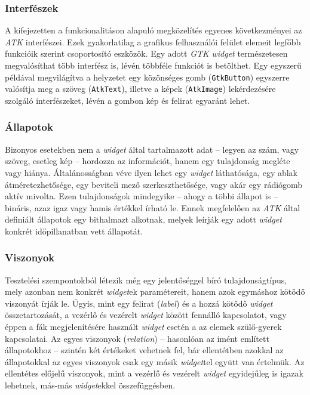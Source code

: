 \subsubsection{Interfészek}

A kifejezetten a funkcionalitáson alapuló megközelítés egyenes következményei az \textit{ATK} interfészei. Ezek gyakorlatilag a grafikus felhasználói felület elemeit legfőbb funkcióik szerint csoportosító eszközök. Egy adott \textit{GTK} \textit{widget} természetesen megvalósíthat több interfész is, lévén többféle funkciót is betölthet. Egy egyszerű példával megvilágítva a helyzetet egy közönséges gomb (\texttt{GtkButton}) egyszerre valósítja meg a szöveg (\texttt{AtkText}), illetve a képek (\texttt{AtkImage}) lekérdezésére szolgáló interfészeket, lévén a gombon kép és felirat egyaránt lehet.

\subsubsection{Állapotok}

Bizonyos esetekben nem a \textit{widget} által tartalmazott adat -- legyen az szám, vagy szöveg, esetleg kép -- hordozza az információt, hanem egy tulajdonság megléte vagy hiánya. Általánosságban véve ilyen lehet egy \textit{widget} láthatósága, egy ablak átméretezhetősége, egy beviteli mező szerkeszthetősége, vagy akár egy rádiógomb aktív mivolta. Ezen tulajdonságok mindegyike -- ahogy a többi állapot is -- bináris, azaz igaz vagy hamis értékkel írható le. Ennek megfelelően az \textit{ATK} által definiált állapotok egy bithalmazt alkotnak, melyek leírják egy adott \textit{widget} konkrét időpillanatban vett állapotát.

\subsubsection{Viszonyok}

Tesztelési szempontokból létezik még egy jelentőséggel bíró tulajdonságtípus, mely azonban nem konkrét \textit{widget}ek paramétereit, hanem azok egymáshoz kötődő viszonyát írják le. Úgyis, mint egy felirat (\textit{label}) és a hozzá kötődő \textit{widget} összetartozását, a vezérlő és vezérelt \textit{widget} között fennálló kapcsolatot, vagy éppen a fák megjelenítésére használt \textit{widget} esetén a az elemek szülő-gyerek kapcsolatai. Az egyes viszonyok (\textit{relation}) -- hasonlóan az imént említett állapotokhoz -- szintén két értékeket vehetnek fel, bár ellentétben azokkal az állapotokkal az egyes viszonyok csak egy másik \textit{widget}tel együtt van értelmük. Az ellentétes előjelű viszonyok, mint a vezérlő és vezérelt \textit{widget} egyidejűleg is igazak lehetnek, más-más \textit{widget}ekkel összefüggésben.

